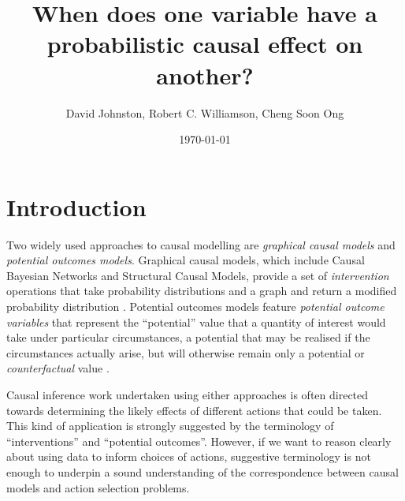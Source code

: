 \documentclass{article}
\title{When does one variable have a probabilistic causal effect on another?}
\date{\today}
\author{ David Johnston, Robert C. Williamson, Cheng Soon Ong }
\theoremstyle{plain}
\theoremstyle{definition}
\begin{document}
\maketitle


\tableofcontents


\section{Introduction}

Two widely used approaches to causal modelling are \emph{graphical causal models} and \emph{potential outcomes models}. Graphical causal models, which include Causal Bayesian Networks and Structural Causal Models, provide a set of \emph{intervention} operations that take probability distributions and a graph and return a modified probability distribution \citep{pearl_causality:_2009}. Potential outcomes models feature \emph{potential outcome variables} that represent the ``potential'' value that a quantity of interest would take under particular circumstances, a potential that may be realised if the circumstances actually arise, but will otherwise remain only a potential or \emph{counterfactual} value \citep{rubin_causal_2005}.

Causal inference work undertaken using either approaches is often directed towards determining the likely effects of different actions that could be taken. This kind of application is strongly suggested by the terminology of ``interventions'' and ``potential outcomes''. However, if we want to reason clearly about using data to inform choices of actions, suggestive terminology is not enough to underpin a sound understanding of the correspondence between causal models and action selection problems.

\end{document}
